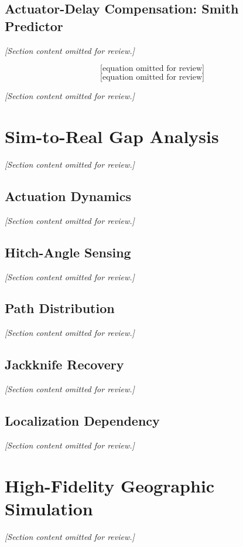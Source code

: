 \subsection{Actuator-Delay Compensation: Smith Predictor}
\label{sec:smith_predictor}
\textit{[Section content omitted for review.]}

\begin{equation}
\text{[equation omitted for review]}
\label{eq:smith_residual}
\end{equation}
\begin{equation}
\text{[equation omitted for review]}
\label{eq:smith_predict}
\end{equation}

\textit{[Section content omitted for review.]}

\section{Sim-to-Real Gap Analysis}
\textit{[Section content omitted for review.]}

\subsection{Actuation Dynamics}
\label{sec:gap_actuation}
\textit{[Section content omitted for review.]}

\subsection{Hitch-Angle Sensing}
\label{sec:gap_hitch}
\textit{[Section content omitted for review.]}

\subsection{Path Distribution}
\textit{[Section content omitted for review.]}

\subsection{Jackknife Recovery}
\textit{[Section content omitted for review.]}

\subsection{Localization Dependency}
\textit{[Section content omitted for review.]}

\section{High-Fidelity Geographic Simulation}
\label{sec:geo_sim}
\textit{[Section content omitted for review.]}

